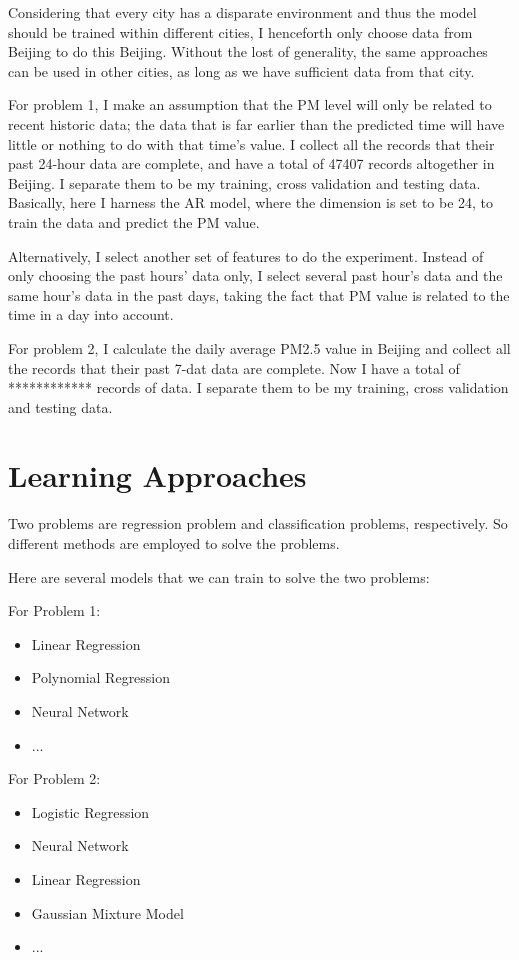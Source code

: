 \documentclass{sig-alternate}
\begin{document}
Considering that every city has a disparate environment and thus the model should be trained within different cities, I henceforth only choose data from Beijing to do this Beijing. Without the lost of generality, the same approaches can be used in other cities, as long as we have sufficient data from that city.

For problem 1, I make an assumption that the PM level will only be related to recent historic data; the data that is far earlier than the predicted time will have little or nothing to do with that time's value. I collect all the records that their past 24-hour data are complete, and have a total of 47407 records altogether in Beijing. I separate them to be my training, cross validation and testing data. Basically, here I harness the AR model, where the dimension is set to be 24, to train the data and predict the PM value.

 Alternatively, I select another set of features to do the experiment. Instead of only choosing the past hours' data only, I select several past hour's data and the same hour's data in the past days, taking the fact that PM value is related to the time in a day into account.

For problem 2, I calculate the daily average PM2.5 value in Beijing and collect all the records that their past 7-dat data are complete. Now I have a total of ************ records of data. I separate them to be my training, cross validation and testing data.






\section{Learning Approaches}
Two problems are regression problem and classification problems, respectively. So different methods are employed to solve the problems.

Here are several models that we can train to solve the two problems:


For Problem 1:
\begin{itemize}
	\item Linear Regression
    \item Polynomial Regression
	\item Neural Network
    \item ...
\end{itemize}

For Problem 2:
\begin{itemize}
	\item Logistic Regression
    \item Neural Network
    \item Linear Regression
    \item Gaussian Mixture Model
    \item ...
\end{itemize}
\end{document}
